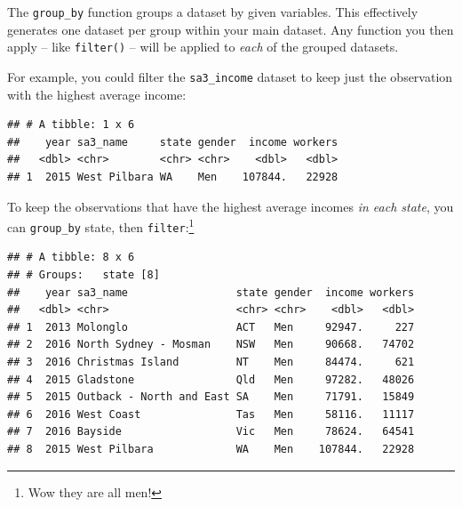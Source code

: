 \documentclass[]{book}
\newenvironment{Shaded}{\begin{snugshade}}{\end{snugshade}}
\newcommand{\KeywordTok}[1]{\textcolor[rgb]{0.13,0.29,0.53}{\textbf{#1}}}
\newcommand{\NormalTok}[1]{#1}
\newcommand{\OperatorTok}[1]{\textcolor[rgb]{0.81,0.36,0.00}{\textbf{#1}}}
\newcommand{\StringTok}[1]{\textcolor[rgb]{0.31,0.60,0.02}{#1}}
\begin{document}
The \texttt{group\_by} function groups a dataset by given variables. This effectively generates one dataset per group within your main dataset. Any function you then apply -- like \texttt{filter()} -- will be applied to \emph{each} of the grouped datasets.

For example, you could filter the \texttt{sa3\_income} dataset to keep just the observation with the highest average income:

\begin{Shaded}
\end{Shaded}

\begin{verbatim}
## # A tibble: 1 x 6
##    year sa3_name     state gender  income workers
##   <dbl> <chr>        <chr> <chr>    <dbl>   <dbl>
## 1  2015 West Pilbara WA    Men    107844.   22928
\end{verbatim}

To keep the observations that have the highest average incomes \emph{in each state}, you can \texttt{group\_by} state, then \texttt{filter}:\footnote{Wow they are all men!}

\begin{Shaded}
\end{Shaded}

\begin{verbatim}
## # A tibble: 8 x 6
## # Groups:   state [8]
##    year sa3_name                 state gender  income workers
##   <dbl> <chr>                    <chr> <chr>    <dbl>   <dbl>
## 1  2013 Molonglo                 ACT   Men     92947.     227
## 2  2016 North Sydney - Mosman    NSW   Men     90668.   74702
## 3  2016 Christmas Island         NT    Men     84474.     621
## 4  2015 Gladstone                Qld   Men     97282.   48026
## 5  2015 Outback - North and East SA    Men     71791.   15849
## 6  2016 West Coast               Tas   Men     58116.   11117
## 7  2016 Bayside                  Vic   Men     78624.   64541
## 8  2015 West Pilbara             WA    Men    107844.   22928
\end{verbatim}
\end{document}
